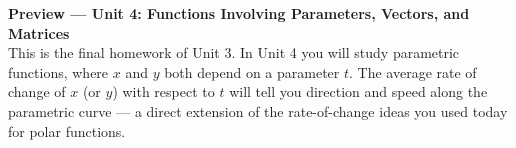 \documentclass[10pt]{article}
\begin{document}
\vspace{0.08in}

\begin{tcolorbox}[colback=navylight, colframe=navy, arc=2mm,
    left=3mm, right=3mm, top=2mm, bottom=2mm]
\small\textbf{Preview --- Unit 4: Functions Involving Parameters, Vectors, and Matrices}\\
This is the final homework of Unit 3. In Unit 4 you will study parametric functions,
where $x$ and $y$ both depend on a parameter $t$. The average rate of change of $x$
(or $y$) with respect to $t$ will tell you direction and speed along the parametric curve ---
a direct extension of the rate-of-change ideas you used today for polar functions.
\end{tcolorbox}
\end{document}
